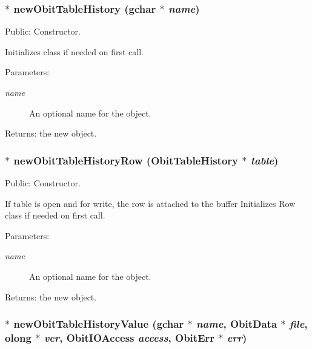 \subsubsection{$\ast$ new\-Obit\-Table\-History (gchar $\ast$ {\em name})}\label{ObitTableHistory_8c_a16}


Public: Constructor. 

Initializes class if needed on first call. \begin{Desc}
\item[Parameters:]
\begin{description}
\item[{\em name}]An optional name for the object. \end{description}
\end{Desc}
\begin{Desc}
\item[Returns:]the new object. \end{Desc}
\subsubsection{$\ast$ new\-Obit\-Table\-History\-Row ({\bf Obit\-Table\-History} $\ast$ {\em table})}\label{ObitTableHistory_8c_a14}


Public: Constructor. 

If table is open and for write, the row is attached to the buffer Initializes Row class if needed on first call. \begin{Desc}
\item[Parameters:]
\begin{description}
\item[{\em name}]An optional name for the object. \end{description}
\end{Desc}
\begin{Desc}
\item[Returns:]the new object. \end{Desc}
\subsubsection{$\ast$ new\-Obit\-Table\-History\-Value (gchar $\ast$ {\em name}, {\bf Obit\-Data} $\ast$ {\em file}, {\bf olong} $\ast$ {\em ver}, Obit\-IOAccess {\em access}, {\bf Obit\-Err} $\ast$ {\em err})}\label{ObitTableHistory_8c_a18}


